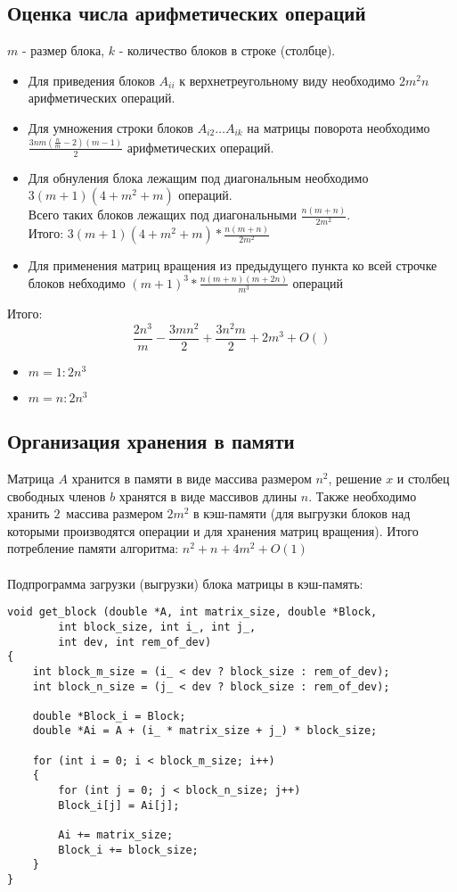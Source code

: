 \documentclass[a4paper, fontsize=14pt]{article}
\begin{document}
		\subsection{Оценка числа арифметических операций}
		$m$ - размер блока, $k$ - количество блоков в строке (столбце). 
		\begin{itemize}
			\item Для приведения блоков $A_{ii}$ к верхнетреугольному виду необходимо $2m^2n$ арифметических операций.
			\item Для умножения строки блоков $A_{i2}\dots A_{ik}$ на матрицы поворота необходимо $\frac{3nm(\frac{n}{m}-2)(m-1)}{2}$ арифметических операций.
			\item Для обнуления блока лежащим под диагональным необходимо $3(m+1)(4 + m^2 +m)$ операций.
			\\Всего таких блоков лежащих под диагональными $\frac{n(m+n)}{2m^2}$.
			\\ Итого: $3(m+1)(4 + m^2 +m) * \frac{n(m+n)}{2m^2}$
			\item Для применения матриц вращения из предыдущего пункта ко всей строчке блоков небходимо $(m+1)^3 *\frac{n(m+n)(m+2n)}{m^3}$ операций
			
		\end{itemize}
		Итого: $$\frac{2n^3}{m} - \frac{3mn^2}{2} + \frac{3n^2m}{2} + 2m^3 + O ()$$
	
		\begin{itemize}
			\item $m = 1: 2n^3$
			\item $m = n: 2n^3$
		\end{itemize}
		\subsection{Организация хранения в памяти}
		Матрица $A$ хранится в памяти в виде массива размером $n^2$, решение $x$ и столбец свободных членов $b$ хранятся в виде массивов длины $n$. Также необходимо хранить $2\,$ массива размером $2m^2$ в кэш-памяти (для выгрузки блоков над которыми производятся операции и для хранения матриц вращения). Итого потребление памяти алгоритма: $n^2 + n + 4m^2 + O(1)$
		\\
		\\Подпрограмма загрузки (выгрузки) блока матрицы в кэш-память:
		\begin{lstlisting}
void get_block (double *A, int matrix_size, double *Block,
		int block_size, int i_, int j_,
		int dev, int rem_of_dev)
{
	int block_m_size = (i_ < dev ? block_size : rem_of_dev);
	int block_n_size = (j_ < dev ? block_size : rem_of_dev);
	
	double *Block_i = Block;
	double *Ai = A + (i_ * matrix_size + j_) * block_size;
	
	for (int i = 0; i < block_m_size; i++)
	{
		for (int j = 0; j < block_n_size; j++)
		Block_i[j] = Ai[j];
		
		Ai += matrix_size;
		Block_i += block_size;
	}
}
		\end{lstlisting}
\end{document}
